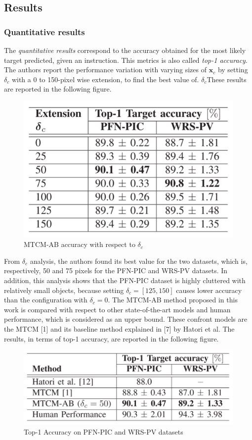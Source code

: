 \newpage
\subsection{Results}\label{header-n322}

\subsubsection{Quantitative results}\label{header-n323}

The \emph{quantitative results} correspond to the accuracy obtained for
the most likely target predicted, given an instruction. This metrics is
also called \emph{top-1 accuracy}. The authors report the performance
variation with varying sizes of ${\mathbf x}_c$ by setting $\delta_c$
with a 0 to 150-pixel wise extension, to find the best value of.
$\delta_c$These results are reported in the following figure.

\begin{figure}[h!]
\centering
\includegraphics[width=0.65\linewidth]{images/MTCMresultssize.png}
\caption{MTCM-AB accuracy with respect to $\delta_c$}
\end{figure}

From $\delta_c$ analysis, the authors found its best value for the two
datasets, which is, respectively, 50 and 75 pixels for the PFN-PIC and
WRS-PV datasets. In addition, this analysis shows that the PFN-PIC
dataset is highly cluttered with relatively small objects, because
setting $\delta_c = [125, 150]$ causes lower accuracy than the
configuration with $\delta_c = 0$. The MTCM-AB method proposed in this
work is compared with respect to other state-of-the-art models and human
performance, which is considered as an upper bound. These confront
models are the MTCM {[}1{]} and its baseline method explained in {[}7{]}
by Hatori et al. The results, in terms of top-1 accuracy, are reported
in the following figure.

\begin{figure}[h!]
\centering
\includegraphics[width=0.75\linewidth]{images/MTCMqualres.png}
\caption{Top-1 Accuracy on PFN-PIC and WRS-PV datasets}
\end{figure}

